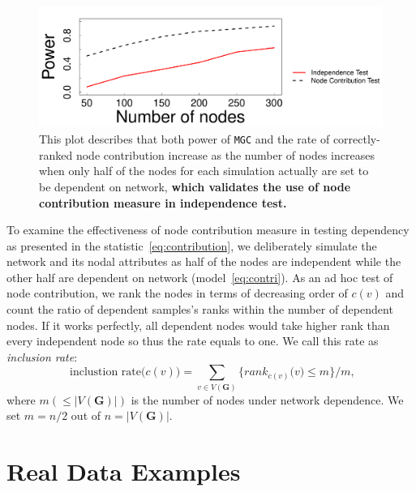 \documentclass[12pt]{article}
\theoremstyle{definition}
\begin{document}
\begin{figure}[h]
	\centering
	\includegraphics[width=\linewidth]{../../Figure/nodecontri.pdf}
	\caption{This plot describes that both power of \texttt{MGC} and the rate of correctly-ranked node contribution increase as the number of nodes increases when only half of the nodes for each simulation actually are set to be dependent on network, \textbf{which validates the use of node contribution measure in independence test.}}
	\label{fig:contribution}
\end{figure}
To examine the effectiveness of node contribution measure in testing dependency as presented in the statistic~\ref{eq:contribution}, we deliberately simulate the network and its nodal attributes as half of the nodes are independent while the other half are dependent on network (model~\ref{eq:contri}). As an ad hoc test of node contribution, we rank the nodes in terms of decreasing order of $c(v)$ and count the ratio of dependent samples's ranks within the number of dependent nodes. If it works perfectly, all dependent nodes would take higher rank than every independent node so thus the rate equals to one. We call this rate as \textit{inclusion rate}:
\begin{equation}
\mbox{ inclustion rate}\big(  c(v) \big) = \sum\limits_{v \in V(\mathbf{G})} \big\{  rank_{c(v)}\big(  v \big)  \leq  m  \big\}   /  m,
\label{eq:inclusion_rate}
\end{equation}
where $m (\leq |V(\mathbf{G})|)$ is the number of nodes under network dependence. We set $m=n/2$ out of $n = |V(\mathbf{G})|$.

\section{Real Data Examples}
\label{sec:real}
\end{document}
